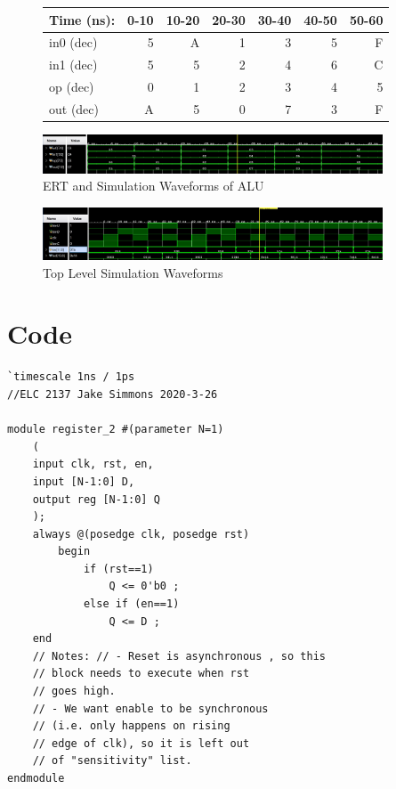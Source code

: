 \documentclass[11pt]{article}
\begin{document}
\begin{figure}[ht]\centering
	\begin{tabular}{l|rrrrrr}
		Time (ns): & 0-10 & 10-20 & 20-30 & 30-40 & 40-50 & 50-60  \\
		\midrule
		in0 (dec) & 5 & A & 1 & 3 & 5 & F \\
		in1 (dec) & 5 & 5 & 2 & 4 & 6 & C \\
		op (dec) & 0 & 1 & 2 & 3 & 4 & 5 \\
		\midrule 
		out (dec) & A & 5 & 0 & 7 & 3 & F \\
		\bottomrule
	\end{tabular}\medskip
	
		\includegraphics[width=0.9\textwidth]{ALU_test.JPG}
		\caption{ERT and Simulation Waveforms of ALU}
		\label{fig:sim_with_table}
\end{figure}

\begin{figure}[ht]\centering
	\includegraphics[width=0.9\textwidth]{top_module_test.JPG}
	\caption{Top Level Simulation Waveforms}
	\label{fig:sim}
	
\end{figure}


\clearpage
\section*{Code}

\begin{lstlisting}[style=Verilog,
caption=Register Module,
label=code:ex 
]
`timescale 1ns / 1ps
//ELC 2137 Jake Simmons 2020-3-26

module register_2 #(parameter N=1) 
	(
	input clk, rst, en, 
	input [N-1:0] D, 
	output reg [N-1:0] Q 
	);
	always @(posedge clk, posedge rst) 
		begin       
			if (rst==1) 
				Q <= 0'b0 ; 
			else if (en==1) 
				Q <= D ; 
	end
	// Notes: // - Reset is asynchronous , so this 
	// block needs to execute when rst 
	// goes high.
	// - We want enable to be synchronous 
	// (i.e. only happens on rising 
	// edge of clk), so it is left out 
	// of "sensitivity" list.
endmodule

\end{lstlisting}
\end{document}
